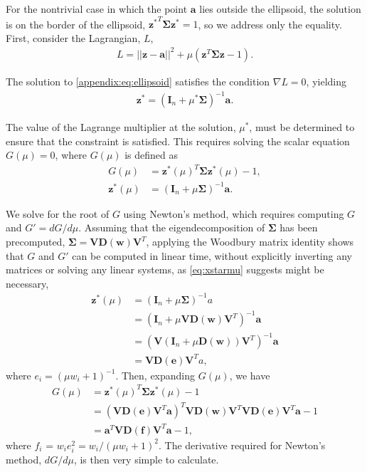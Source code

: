 \documentclass[aip, jcp, reprint, nolinenumbers, twocolumn, nobalancelastpage, nofootinbib]{revtex4-1}
\begin{document}
For the nontrivial case in which the point $\mathbf{a}$ lies outside the ellipsoid, the solution is on the border of the ellipsoid, ${\mathbf{z}^*}^T \mathbf{\Sigma} \mathbf{z}^* = 1$, so we address only the equality. First, consider the Lagrangian, $L$,
\begin{align}
L = ||\mathbf{z}-\mathbf{a}||^2 + \mu(\mathbf{z}^T\mathbf{\Sigma}\mathbf{z}-1).
\end{align}

The solution to \cref{appendix:eq:ellipsoid} satisfies the condition $\nabla L = 0$, yielding
\begin{align}
\mathbf{z}^* = (\mathbf{I}_n + \mu^* \mathbf{\Sigma})^{-1} \mathbf{a}.
\end{align}

The value of the Lagrange multiplier at the solution, $\mu^*$, must be determined to ensure that the constraint is satisfied. This requires solving the scalar equation $G(\mu)=0$, where $G(\mu)$ is defined as
\begin{align}
G(\mu) &= \mathbf{z}^*(\mu)^T \mathbf{\Sigma} \mathbf{z}^*(\mu) - 1, \\
\mathbf{z}^*(\mu) &= (\mathbf{I}_n + \mu \mathbf{\Sigma})^{-1} \mathbf{a}. \label{eq:xstarmu}
\end{align}

We solve for the root of $G$ using Newton's method, which requires computing $G$ and $G' = dG/d\mu$. Assuming that the eigendecomposition of $\mathbf{\Sigma}$ has been precomputed, $\mathbf{\Sigma}=\mathbf{V}\mathbf{D}(\mathbf{w})\mathbf{V}^T$, applying the Woodbury matrix identity shows that $G$ and $G'$ can be computed in linear time, without explicitly inverting any matrices or solving any linear systems, as \cref{eq:xstarmu} suggests might be necessary,
\begin{align}
\mathbf{z}^*(\mu) &= (\mathbf{I}_n + \mu \mathbf{\Sigma})^{-1} a \\
&= (\mathbf{I}_n + \mu \mathbf{V}\mathbf{D}(\mathbf{w})\mathbf{V}^T)^{-1} \mathbf{a} \\
&= (\mathbf{V} (\mathbf{I}_n + \mu \mathbf{D}(\mathbf{w}))\mathbf{V}^T)^{-1} \mathbf{a} \\
&= \mathbf{V}\mathbf{D}(\mathbf{e})\mathbf{V}^T a,
\end{align}
where $e_i = (\mu w_i +1)^{-1}$. Then, expanding $G(\mu)$, we have
\begin{align}
G(\mu) &= \mathbf{z}^*(\mu)^T \mathbf{\Sigma} \mathbf{z}^*(\mu) - 1 \\
&= (\mathbf{V}\mathbf{D}(\mathbf{e})\mathbf{V}^T \mathbf{a})^T \mathbf{V}\mathbf{D}(\mathbf{w})\mathbf{V}^T \mathbf{V}\mathbf{D}(\mathbf{e})\mathbf{V}^T \mathbf{a} - 1 \\
&= \mathbf{a}^T\mathbf{V} \mathbf{D}(\mathbf{f}) \mathbf{V}^T\mathbf{a} - 1,
\end{align}
where $f_i$ = $w_i e_i^2 = w_i/(\mu w_i + 1)^2$. The derivative required for Newton's method, $dG/d\mu$, is then very simple to calculate.
\end{document}
